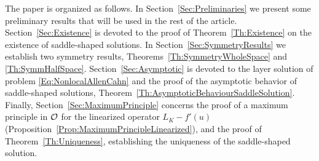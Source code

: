 The paper is organized as follows. In Section~\ref{Sec:Preliminaries} we present some preliminary results that will be used in the rest of the article. Section~\ref{Sec:Existence} is devoted to the proof of Theorem~\ref{Th:Existence} on the existence of saddle-shaped solutions. In Section~\ref{Sec:SymmetryResults} we establish two symmetry results, Theorems~\ref{Th:SymmetryWholeSpace} and \ref{Th:SymmHalfSpace}. Section~\ref{Sec:Asymptotic} is devoted to the layer solution of problem \eqref{Eq:NonlocalAllenCahn} and the proof of the asymptotic behavior of saddle-shaped solutions, Theorem~\ref{Th:AsymptoticBehaviourSaddleSolution}. Finally, Section~\ref{Sec:MaximumPrinciple} concerns the proof of a maximum principle in $\mathcal{O}$ for the linearized operator $L_K - f'(u)$ (Proposition~\ref{Prop:MaximumPrincipleLinearized}), and the proof of Theorem~\ref{Th:Uniqueness}, establishing the uniqueness of the saddle-shaped solution.





